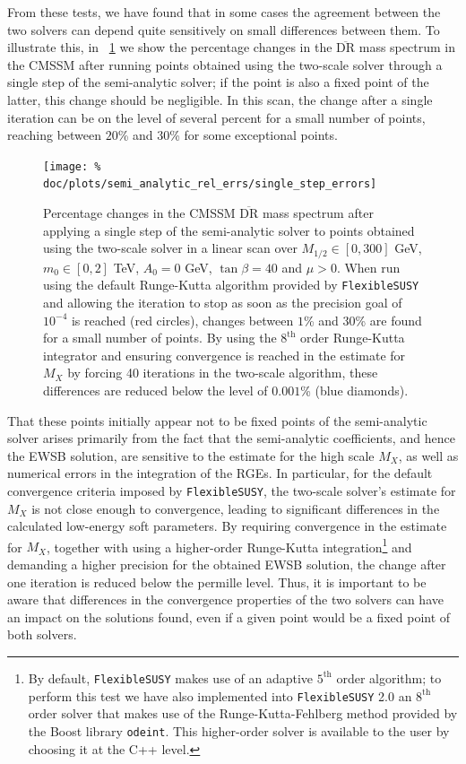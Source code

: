 \documentclass[final,3p,11pt,pdflatex]{elsarticle}
\makeatletter
\newcommand{\fs}{\texttt{FlexibleSUSY}\@\xspace}
\newcommand{\fstwo}{\fs 2.0\@\xspace}
\newcommand{\ol}[1]{\overline{#1}}
\newcommand{\DRbar}{\ensuremath{\ol{\text{DR}}}\xspace}
\newcommand{\figref}[1]{\figurename~\ref{#1}}
\newcommand{\azero}{\ensuremath{A_0}\xspace}
\newcommand{\mhalf}{\ensuremath{M_{1/2}}\xspace}
\newcommand{\mzero}{\ensuremath{m_0}\xspace}
\makeatother
\begin{document}
From these tests, we have found that in some cases the agreement
between the two solvers can depend quite sensitively on small differences
between them.  To illustrate this, in \figref{fig:semi_analytic_differences}
we show the percentage changes in the \DRbar mass spectrum in the CMSSM after
running points obtained using the two-scale solver through a single step of
the semi-analytic solver; if the point is also a fixed point of the latter,
this change should be negligible.  In this
scan, the change after a single iteration can be on the level of several
percent for a small number of points, reaching between $20$\% and $30$\% for
some exceptional points.
%
\begin{figure}[tbh]
  \centering
  \texttt{[image: \%
    doc/plots/semi\_analytic\_rel\_errs/single\_step\_errors]}
  \caption{Percentage changes in the CMSSM \DRbar mass spectrum after
    applying a single step of the semi-analytic solver to points obtained
    using the two-scale solver in a linear scan over $\mhalf \in
    [0,300]$ GeV, $\mzero \in [0,2]$ TeV, $\azero = 0$ GeV, $\tan\beta = 40$ and
    $\mu > 0$.  When run using the default Runge-Kutta algorithm provided
    by \fs and allowing the iteration to stop as soon as the precision goal of
    $10^{-4}$ is reached (red circles), changes between $1$\% and $30$\% are
    found for a small number of points.  By using the $8^{\text{th}}$ order
    Runge-Kutta integrator and ensuring convergence is reached in the
    estimate for $M_X$ by forcing 40 iterations in the two-scale algorithm,
    these differences are reduced below the level of $0.001$\% (blue
    diamonds).}
  \label{fig:semi_analytic_differences}
\end{figure}
%
That these points initially appear not to be fixed points of the semi-analytic
solver arises primarily from the fact that the semi-analytic coefficients,
and hence the EWSB solution, are sensitive to the estimate for the
high scale $M_X$, as well as numerical errors in the integration of the RGEs.
In particular, for the default convergence criteria imposed by \fs, the
two-scale solver's estimate for $M_X$ is not close enough to convergence,
leading to significant differences in the calculated low-energy soft
parameters.  By requiring convergence in the estimate for $M_X$, together with
using a higher-order Runge-Kutta integration\footnote{By default, \fs makes
  use of an adaptive $5^{\text{th}}$ order algorithm; to perform this test we
  have also implemented into \fstwo an $8^{\text{th}}$ order solver that makes
  use of the Runge-Kutta-Fehlberg method provided by the Boost library
  \texttt{odeint}.  This higher-order solver is available to the user by
  choosing it at the C++ level.} and demanding a higher precision for the
obtained EWSB solution, the change after one iteration is reduced below the
permille level.  Thus, it is important to be aware that differences in the
convergence properties of the two solvers can have an impact on the solutions
found, even if a given point would be a fixed point of both solvers.
\end{document}
